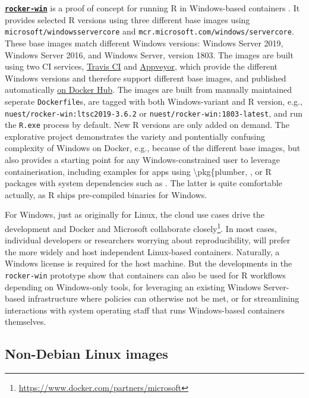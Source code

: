 \textbf{\href{https://github.com/nuest/rocker-win}{\texttt{rocker-win}}}
is a proof of concept for running R in Windows-based containers
\citep{nust_rocker-win_2019}. It provides selected R versions using
three different base images using \texttt{microsoft/windowsservercore}
and \texttt{mcr.microsoft.com/windows/servercore}. These base images
match different Windows versions: Windows Server 2019, Windows Server
2016, and Windows Server, version 1803. The images are built using two
CI services,
\href{https://docs.travis-ci.com/user/reference/windows/}{Travis CI} and
\href{https://www.appveyor.com/docs/windows-images-software/}{Appveyor},
which provide the different Windows versions and therefore support
different base images, and published automatically
\href{https://hub.docker.com/r/nuest/rocker-win}{on Docker Hub}. The
images are built from manually maintained seperate \texttt{Dockerfile}s,
are tagged with both Windows-variant and R version, e.g.,
\texttt{nuest/rocker-win:ltsc2019-3.6.2} or
\texttt{nuest/rocker-win:1803-latest}, and run the \texttt{R.exe}
process by default. New R versions are only added on demand. The
explorative project demonstrates the variety and pontentially confusing
complexity of Windows on Docker, e.g., because of the different base
images, but also provides a starting point for any Windows-constrained
user to leverage containerisation, including examples for apps using
\textbackslash{}pkg\{plumber, , or R packages with system
dependencies such as . The latter is quite comfortable actually,
as R ships pre-compiled binaries for Windows.

For Windows, just as originally for Linux, the cloud use cases drive the
development and Docker and Microsoft collaborate
closely\footnote{\href{https://www.docker.com/partners/microsoft}{https://www.docker.com/partners/microsoft}}.
In most cases, individual developers or researchers worrying about
reproducibility, will prefer the more widely and host independent
Linux-based containers. Naturally, a Windows license is required for the
host machine. But the developments in the \texttt{rocker-win} prototype
show that containers can also be used for R workflows depending on
Windows-only tools, for leveraging an existing Windows Server-based
infrastructure where policies can otherwise not be met, or for
streamlining interactions with system operating staff that runs
Windows-based containers themselves.

\hypertarget{non-debian-linux-images}{%
\subsection{Non-Debian Linux images}\label{non-debian-linux-images}}

